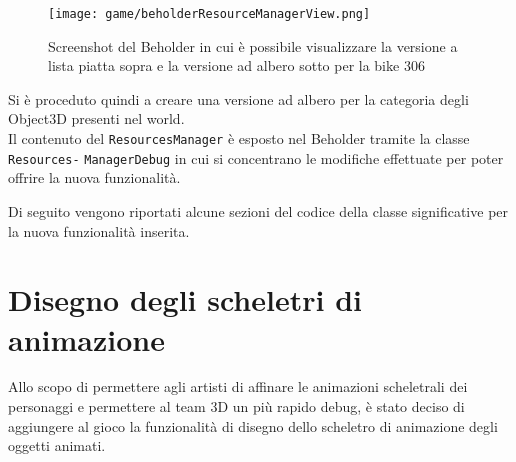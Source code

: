 	\begin{figure}[h!] 
		\centering 
		\hspace*{-0.05\columnwidth}\texttt{[image: game/beholderResourceManagerView.png]} 
		\caption{Screenshot del Beholder in cui è possibile visualizzare la versione a lista piatta sopra e la versione ad albero sotto per la bike 306}
		\label{fig:resource-manager-tree-view}
	\end{figure}
	
	Si è proceduto quindi a creare una versione ad albero per la categoria degli Object3D presenti nel world.\\
	
	Il contenuto del \texttt{ResourcesManager} è esposto nel Beholder tramite la classe \texttt{Resources-} \texttt{ManagerDebug} in cui si concentrano le modifiche effettuate per poter offrire la nuova funzionalità.
	
	Di seguito vengono riportati alcune sezioni del codice della classe significative per la nuova funzionalità inserita.
	
	
	
	\newpage
	
	
	
	

\section{Disegno degli scheletri di animazione}
	
	Allo scopo di permettere agli artisti di affinare le animazioni scheletrali dei personaggi e permettere al team 3D un più rapido debug, è stato deciso di aggiungere al gioco la funzionalità di disegno dello scheletro di animazione degli oggetti animati.\\
	
